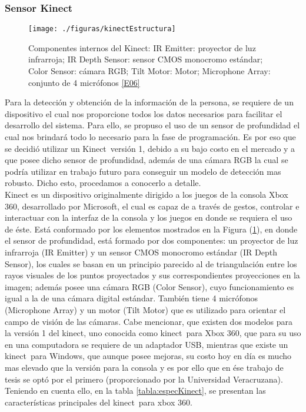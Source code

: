 \documentclass[a4paper,openright,12pt]{report}
\begin{document}
\subsubsection{Sensor Kinect}
\begin{figure}[thb]
	\centering
	\texttt{[image: ./figuras/kinectEstructura]}
	\caption[Componentes internos del Kinect\textcopyright ]{Componentes internos del Kinect\textcopyright: IR Emitter: proyector de luz infrarroja; IR Depth Sensor: sensor CMOS monocromo estándar; Color Sensor: cámara RGB; Tilt Motor: Motor; Microphone Array: conjunto de 4 micrófonos \hyperlink{e06}{[E06]}} \label{fig:kinectEstructura}
\end{figure}
Para la detección y obtención de la información de la persona, se requiere de un dispositivo el cual nos proporcione todos los datos necesarios para facilitar el desarrollo del sistema. Para ello, se propuso el uso de un sensor de profundidad el cual nos brindará todo lo necesario para la fase de programación. Es por eso que se decidió utilizar un Kinect\textcopyright\ versión 1, debido a su bajo costo en el mercado y a que posee dicho sensor de profundidad, además de una cámara RGB la cual se podría utilizar en trabajo futuro para conseguir un modelo de detección mas robusto. Dicho esto, procedamos a conocerlo a detalle.\\
Kinect es un dispositivo originalmente dirigido a los juegos de la consola Xbox 360\textregistered, desarrollado por Microsoft\textregistered, el cual es capaz de a través de gestos, controlar e interactuar con la interfaz de la consola y los juegos en donde se requiera el uso de éste. Está conformado por los elementos mostrados en la Figura (\ref{fig:kinectEstructura}), en donde el sensor de profundidad, está formado por dos componentes: un proyector de luz infrarroja (IR Emitter) y un sensor CMOS monocromo estándar (IR Depth Sensor), los cuales se basan en un principio parecido al de triangulación entre los rayos visuales de los puntos proyectados y sus correspondientes proyecciones en la imagen; además posee una cámara RGB (Color Sensor), cuyo funcionamiento es igual a la de una cámara digital estándar. También tiene 4 micrófonos (Microphone Array) y un motor (Tilt Motor) que es utilizado para orientar el campo de visión de las cámaras. Cabe mencionar, que existen dos modelos para la versión 1 del kinect\textcopyright, uno conocida como kinect\textcopyright\ para Xbox 360, que para su uso en una computadora se requiere de un adaptador USB, mientras que existe un kinect\textcopyright\ para Windows, que aunque posee mejoras, su costo hoy en día es mucho mas elevado que la versión para la consola y es por ello que en ése trabajo de tesis se optó por el primero (proporcionado por la Universidad Veracruzana). Teniendo en cuenta ello, en la tabla \ref{tabla:especKinect}, se presentan las características principales del kinect\textcopyright\ para xbox 360.\\
\end{document}
